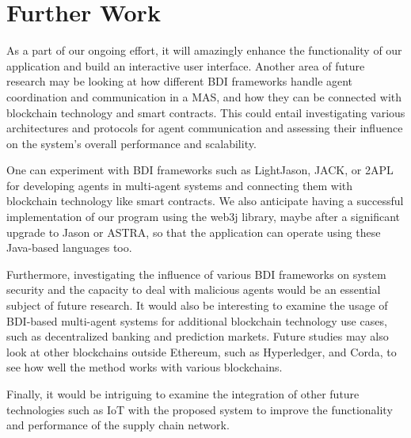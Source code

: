 {\chapter{Further Work}}
As a part of our ongoing effort, it will amazingly enhance the functionality of our application and build an interactive user interface. Another area of future research may be looking at how different \ac{BDI} frameworks handle agent coordination and communication in a \ac{MAS}, and how they can be connected with blockchain technology and smart contracts. This could entail investigating various architectures and protocols for agent communication and assessing their influence on the system's overall performance and scalability.

\vspace{.5cm}

One can experiment with \ac{BDI} frameworks such as LightJason, JACK, or 2APL for developing agents in multi-agent systems and connecting them with blockchain technology like smart contracts. We also anticipate having a successful implementation of our program using the web3j library, maybe after a significant upgrade to Jason or ASTRA, so that the application can operate using these Java-based languages too.

\vspace{.5cm}

Furthermore, investigating the influence of various \ac{BDI} frameworks on system security and the capacity to deal with malicious agents would be an essential subject of future research. It would also be interesting to examine the usage of \ac{BDI}-based multi-agent systems for additional blockchain technology use cases, such as decentralized banking and prediction markets. Future studies may also look at other blockchains outside Ethereum, such as Hyperledger, and Corda, to see how well the method works with various blockchains.

\vspace{.5cm}

Finally, it would be intriguing to examine the integration of other future technologies such as \ac{IoT} with the proposed system to improve the functionality and performance of the supply chain network.